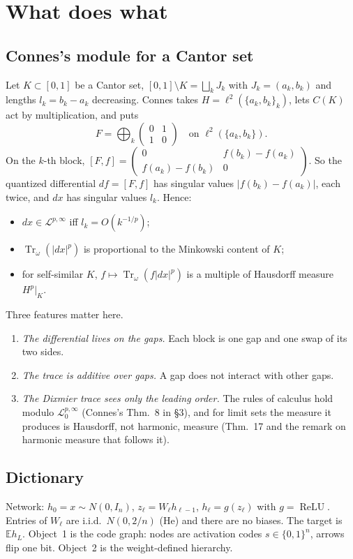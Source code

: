 \documentclass[11pt]{article}
\theoremstyle{definition}
\theoremstyle{remark}
\newcommand{\E}{\mathbb E}
\newcommand{\Tr}{\operatorname{Tr}}
\newcommand{\relu}{\operatorname{ReLU}}
\begin{document}
\tableofcontents

\section{What does what}\label{sec:roles}

\subsection{Connes's module for a Cantor set}
Let $K\subset[0,1]$ be a Cantor set, $[0,1]\setminus K=\bigsqcup_kJ_k$ with $J_k=(a_k,b_k)$ and lengths $l_k=b_k-a_k$ decreasing. Connes takes $H=\ell^2(\{a_k,b_k\}_k)$, lets $C(K)$ act by multiplication, and puts
\[
F=\bigoplus_k\begin{pmatrix}0&1\\1&0\end{pmatrix}\quad\text{on }\ell^2(\{a_k,b_k\}).
\]
On the $k$-th block, $[F,f]=\begin{pmatrix}0&f(b_k)-f(a_k)\\ f(a_k)-f(b_k)&0\end{pmatrix}$. So the quantized differential $df=[F,f]$ has singular values $|f(b_k)-f(a_k)|$, each twice, and $dx$ has singular values $l_k$. Hence:
\begin{itemize}
\item $dx\in\mathcal L^{p,\infty}$ iff $l_k=O(k^{-1/p})$;
\item $\Tr_\omega(|dx|^p)$ is proportional to the Minkowski content of $K$;
\item for self-similar $K$, $f\mapsto\Tr_\omega(f|dx|^p)$ is a multiple of Hausdorff measure $H^p|_K$.
\end{itemize}
Three features matter here.
\begin{enumerate}
\item \emph{The differential lives on the gaps.} Each block is one gap and one swap of its two sides.
\item \emph{The trace is additive over gaps.} A gap does not interact with other gaps.
\item \emph{The Dixmier trace sees only the leading order.} The rules of calculus hold modulo $\mathcal L^{p,\infty}_0$ (Connes's Thm.~8 in \S3), and for limit sets the measure it produces is Hausdorff, not harmonic, measure (Thm.~17 and the remark on harmonic measure that follows it).
\end{enumerate}

\subsection{Dictionary}
Network: $h_0=x\sim N(0,I_n)$, $z_\ell=W_\ell h_{\ell-1}$, $h_\ell=g(z_\ell)$ with $g=\relu$. Entries of $W_\ell$ are i.i.d.\ $N(0,2/n)$ (He) and there are no biases. The target is $\E h_L$. Object~1 is the code graph: nodes are activation codes $s\in\{0,1\}^n$, arrows flip one bit. Object~2 is the weight-defined hierarchy.
\end{document}

